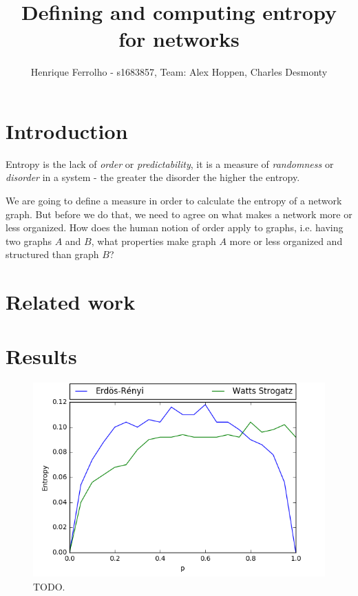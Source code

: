 \documentclass[journal]{IEEEtran}
\begin{document}
\title{Defining and computing entropy for networks}

\author{
Henrique Ferrolho - s1683857,
Team: Alex Hoppen, Charles Desmonty
}

\maketitle


\begin{abstract}
\end{abstract}


\section{Introduction}

Entropy is the lack of \textit{order} or \textit{predictability}, it is a measure of \textit{randomness} or \textit{disorder} in a system - the greater the disorder the higher the entropy.

We are going to define a measure in order to calculate the entropy of a network graph. But before we do that, we need to agree on what makes a network more or less organized. How does the human notion of order apply to graphs, i.e. having two graphs $A$ and $B$, what properties make graph $A$ more or less organized and structured than graph $B$?


\section{Related work}


\section{Results}

\begin{figure}[ht]
    \centering
    \includegraphics[width=\linewidth]{res/entropy1/experiment_n500.png}
    \caption{TODO.
    }
\end{figure}
\end{document}
